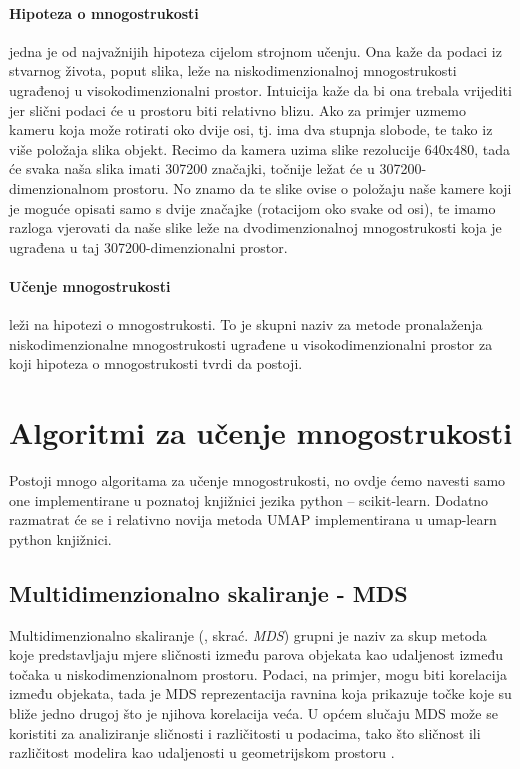 \documentclass[times, utf8, diplomski]{fer}
\begin{document}
\paragraph{Hipoteza o mnogostrukosti} jedna je od najvažnijih hipoteza cijelom strojnom učenju. Ona kaže da podaci iz stvarnog života, poput slika, leže na niskodimenzionalnoj mnogostrukosti ugrađenoj u visokodimenzionalni prostor. Intuicija kaže da bi ona trebala vrijediti jer slični podaci će u prostoru biti relativno blizu. Ako za primjer uzmemo kameru koja može rotirati oko dvije osi, tj. ima dva stupnja slobode, te tako iz više položaja slika objekt. Recimo da kamera uzima slike rezolucije 640x480, tada će svaka naša slika imati 307200 značajki, točnije ležat će u 307200-dimenzionalnom prostoru. No znamo da te slike ovise o položaju naše kamere koji je moguće opisati samo s dvije značajke (rotacijom oko svake od osi), te imamo razloga vjerovati da naše slike leže na dvodimenzionalnoj mnogostrukosti koja je ugrađena u taj 307200-dimenzionalni prostor.

\paragraph{Učenje mnogostrukosti} leži na hipotezi o mnogostrukosti. To je skupni naziv za metode pronalaženja niskodimenzionalne mnogostrukosti ugrađene u visokodimenzionalni prostor za koji hipoteza o mnogostrukosti tvrdi da postoji.

\section{Algoritmi za učenje mnogostrukosti}

Postoji mnogo algoritama za učenje mnogostrukosti, no ovdje ćemo navesti samo one implementirane u poznatoj knjižnici jezika python – scikit-learn. Dodatno razmatrat će se i relativno novija metoda UMAP implementirana u umap-learn python knjižnici.

\subsection{Multidimenzionalno skaliranje - MDS}

Multidimenzionalno skaliranje (, skrać. \emph{MDS}) grupni je naziv za skup metoda koje predstavljaju mjere sličnosti između parova objekata kao udaljenost između točaka u niskodimenzionalnom prostoru. Podaci, na primjer, mogu biti korelacija između objekata, tada je MDS reprezentacija ravnina koja prikazuje točke koje su bliže jedno drugoj što je njihova korelacija veća. U općem slučaju MDS može se koristiti za analiziranje sličnosti i različitosti u podacima, tako što sličnost ili različitost modelira kao udaljenosti u geometrijskom prostoru \citep{borg2005modern}.
\end{document}
